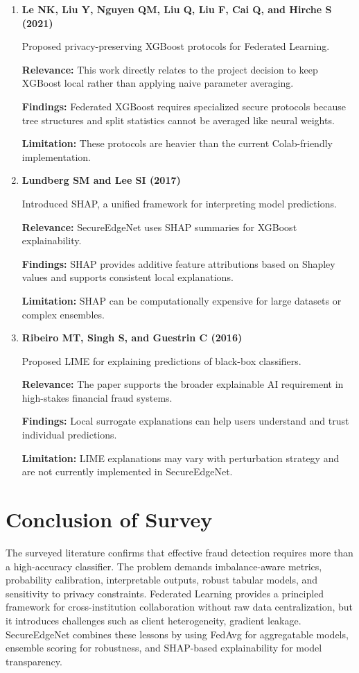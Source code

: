 \begin{enumerate}
    \textbf{Limitation:} SecureEdgeNet assumes a shared fraud feature schema and does not implement transfer FL.

    \item \textbf{Le NK, Liu Y, Nguyen QM, Liu Q, Liu F, Cai Q, and Hirche S (2021) \cite{ref23}}

    Proposed privacy-preserving XGBoost protocols for Federated Learning.

    \textbf{Relevance:} This work directly relates to the project decision to keep XGBoost local rather than applying naive parameter averaging.

    \textbf{Findings:} Federated XGBoost requires specialized secure protocols because tree structures and split statistics cannot be averaged like neural weights.

    \textbf{Limitation:} These protocols are heavier than the current Colab-friendly implementation.

    \item \textbf{Lundberg SM and Lee SI (2017) \cite{ref24}}

    Introduced SHAP, a unified framework for interpreting model predictions.

    \textbf{Relevance:} SecureEdgeNet uses SHAP summaries for XGBoost explainability.

    \textbf{Findings:} SHAP provides additive feature attributions based on Shapley values and supports consistent local explanations.

    \textbf{Limitation:} SHAP can be computationally expensive for large datasets or complex ensembles.

    \item \textbf{Ribeiro MT, Singh S, and Guestrin C (2016) \cite{ref25}}

    Proposed LIME for explaining predictions of black-box classifiers.

    \textbf{Relevance:} The paper supports the broader explainable AI requirement in high-stakes financial fraud systems.

    \textbf{Findings:} Local surrogate explanations can help users understand and trust individual predictions.

    \textbf{Limitation:} LIME explanations may vary with perturbation strategy and are not currently implemented in SecureEdgeNet.
\end{enumerate}

\section{Conclusion of Survey}
The surveyed literature confirms that effective fraud detection requires more than a high-accuracy classifier. The problem demands imbalance-aware metrics, probability calibration, interpretable outputs, robust tabular models, and sensitivity to privacy constraints. Federated Learning provides a principled framework for cross-institution collaboration without raw data centralization, but it introduces challenges such as client heterogeneity, gradient leakage. SecureEdgeNet combines these lessons by using FedAvg for aggregatable models, ensemble scoring for robustness, and SHAP-based explainability for model transparency.
